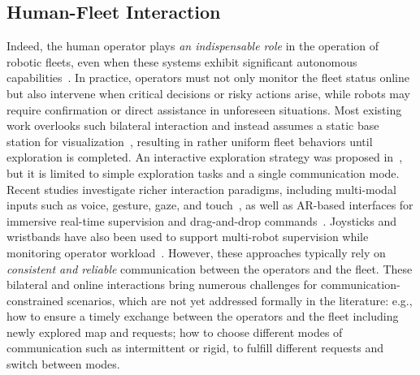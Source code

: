 \subsection{Human-Fleet Interaction}
Indeed, the human operator plays \emph{an indispensable role}
in the operation of robotic fleets, even when these systems exhibit
significant autonomous capabilities~\cite{dahiya2023survey}.
In practice, operators must not only monitor the fleet status online
but also intervene when critical decisions or risky actions arise,
while robots may require confirmation or direct assistance in unforeseen situations.
Most existing work overlooks such bilateral interaction and instead assumes
a static base station for visualization~\cite{klaesson2020planning, gao2022meeting,
saboia2022achord, schack2024sound, dahlquist2025deployment},
resulting in rather uniform fleet behaviors until exploration is completed.
An interactive exploration strategy was proposed in~\cite{tian2024ihero},
but it is limited to simple exploration tasks and a single communication mode.
Recent studies investigate richer interaction paradigms,
including multi-modal inputs such as voice, gesture, gaze, and touch~\cite{riley2023fielded},
as well as AR-based interfaces for immersive real-time supervision and drag-and-drop commands~\cite{chen20243d}.
Joysticks and wristbands have also been used to support multi-robot supervision
while monitoring operator workload~\cite{villani2020humans}.
However, these approaches typically rely on \emph{consistent and reliable} communication between the operators and the fleet.
These bilateral and online interactions bring numerous challenges for communication-constrained scenarios,
which are not yet addressed formally in the literature: e.g., how to ensure a timely exchange
between the operators and the fleet including newly explored map and requests;
how to choose different modes of communication such as intermittent or rigid,
to fulfill different requests and switch between modes.


